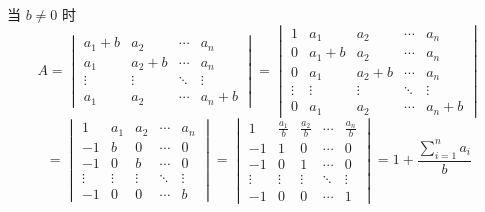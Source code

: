 \begin{enumerate}
                   当 $b \neq 0$ 时
                   \[ A = \begin{vmatrix}
                           a_{1}+b & a_{2}   & \cdots & a_{n}   \\
                           a_{1}   & a_{2}+b & \cdots & a_{n}   \\
                           \vdots  & \vdots  & \ddots & \vdots  \\
                           a_{1}   & a_{2}   & \cdots & a_{n}+b
                       \end{vmatrix} = \begin{vmatrix}
                           1      & a_{1}   & a_{2}   & \cdots & a_{n}   \\
                           0      & a_{1}+b & a_{2}   & \cdots & a_{n}   \\
                           0      & a_{1}   & a_{2}+b & \cdots & a_{n}   \\
                           \vdots & \vdots  & \vdots  & \ddots & \vdots  \\
                           0      & a_{1}   & a_{2}   & \cdots & a_{n}+b
                       \end{vmatrix} \]
                   \[ = \begin{vmatrix}
                           1      & a_{1}  & a_{2}  & \cdots & a_{n}  \\
                           -1     & b      & 0      & \cdots & 0      \\
                           -1     & 0      & b      & \cdots & 0      \\
                           \vdots & \vdots & \vdots & \ddots & \vdots \\
                           -1     & 0      & 0      & \cdots & b
                       \end{vmatrix} = \begin{vmatrix}
                           1      & \frac{a_{1}}{b} & \frac{a_{2}}{b} & \cdots & \frac{a_{n}}{b} \\
                           -1     & 1               & 0               & \cdots & 0               \\
                           -1     & 0               & 1               & \cdots & 0               \\
                           \vdots & \vdots          & \vdots          & \ddots & \vdots          \\
                           -1     & 0               & 0               & \cdots & 1
                       \end{vmatrix} = 1 + \frac{\displaystyle \sum_{i=1}^{n} a_{i}}{b} \]


\end{enumerate}
